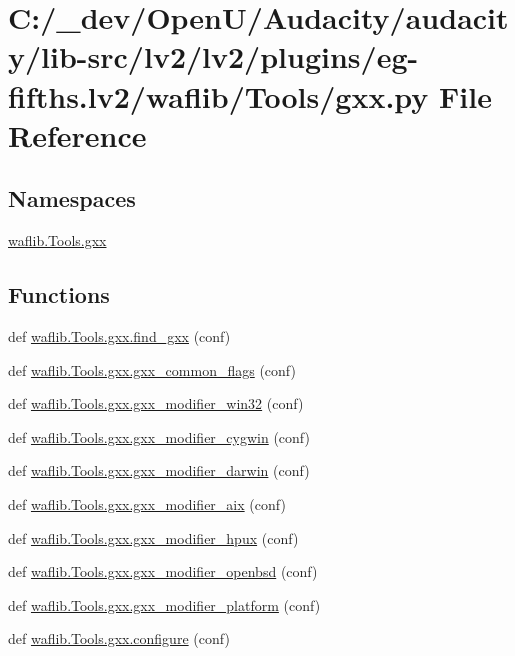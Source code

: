 \hypertarget{lv2_2plugins_2eg-fifths_8lv2_2waflib_2_tools_2gxx_8py}{}\section{C\+:/\+\_\+dev/\+Open\+U/\+Audacity/audacity/lib-\/src/lv2/lv2/plugins/eg-\/fifths.lv2/waflib/\+Tools/gxx.py File Reference}
\label{lv2_2plugins_2eg-fifths_8lv2_2waflib_2_tools_2gxx_8py}
\subsection*{Namespaces}
\begin{DoxyCompactItemize}
\item 
 \hyperlink{namespacewaflib_1_1_tools_1_1gxx}{waflib.\+Tools.\+gxx}
\end{DoxyCompactItemize}
\subsection*{Functions}
\begin{DoxyCompactItemize}
\item 
def \hyperlink{namespacewaflib_1_1_tools_1_1gxx_a429b712dd222e6e975da527c68c08ba8}{waflib.\+Tools.\+gxx.\+find\+\_\+gxx} (conf)
\item 
def \hyperlink{namespacewaflib_1_1_tools_1_1gxx_a86410b2f6bcf01791c43e27ddebf3080}{waflib.\+Tools.\+gxx.\+gxx\+\_\+common\+\_\+flags} (conf)
\item 
def \hyperlink{namespacewaflib_1_1_tools_1_1gxx_a5161aa30bcb691ffeb6b39da4b9b2b62}{waflib.\+Tools.\+gxx.\+gxx\+\_\+modifier\+\_\+win32} (conf)
\item 
def \hyperlink{namespacewaflib_1_1_tools_1_1gxx_a70609bea69338d82affec21284c6c5dc}{waflib.\+Tools.\+gxx.\+gxx\+\_\+modifier\+\_\+cygwin} (conf)
\item 
def \hyperlink{namespacewaflib_1_1_tools_1_1gxx_afb73b72b4db84fa412549484f754901e}{waflib.\+Tools.\+gxx.\+gxx\+\_\+modifier\+\_\+darwin} (conf)
\item 
def \hyperlink{namespacewaflib_1_1_tools_1_1gxx_aae0a6b0cc6273670e94d02a1601481ca}{waflib.\+Tools.\+gxx.\+gxx\+\_\+modifier\+\_\+aix} (conf)
\item 
def \hyperlink{namespacewaflib_1_1_tools_1_1gxx_a5862cdb93d3572914361f8f6261e8a18}{waflib.\+Tools.\+gxx.\+gxx\+\_\+modifier\+\_\+hpux} (conf)
\item 
def \hyperlink{namespacewaflib_1_1_tools_1_1gxx_a6915c3fe47d85e1eca7787adfc24e570}{waflib.\+Tools.\+gxx.\+gxx\+\_\+modifier\+\_\+openbsd} (conf)
\item 
def \hyperlink{namespacewaflib_1_1_tools_1_1gxx_a8ac4de3cf5a92e00e8c75e1272521afa}{waflib.\+Tools.\+gxx.\+gxx\+\_\+modifier\+\_\+platform} (conf)
\item 
def \hyperlink{namespacewaflib_1_1_tools_1_1gxx_aaf1ce44a59356fa376d25557d760bf6a}{waflib.\+Tools.\+gxx.\+configure} (conf)
\end{DoxyCompactItemize}
